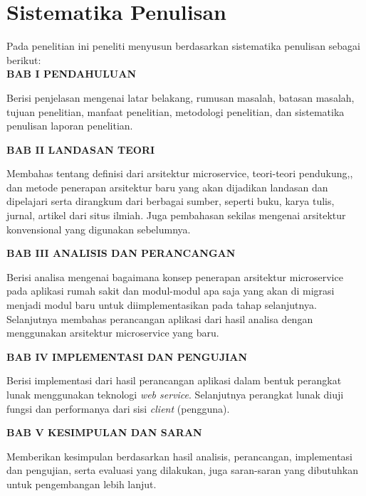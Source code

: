 \section{Sistematika Penulisan}
Pada penelitian ini peneliti menyusun berdasarkan sistematika penulisan sebagai berikut: \\[0.5cm]
\noindent \textbf{BAB I \hspace{1cm} PENDAHULUAN}
\begin{addmargin}[2.35cm]{0em}
Berisi penjelasan mengenai latar belakang, rumusan masalah, batasan masalah, tujuan penelitian, manfaat penelitian, metodologi penelitian, dan sistematika penulisan laporan penelitian. 
\end{addmargin}
\noindent \textbf{BAB II \hspace{0.8cm} LANDASAN TEORI}
\begin{addmargin}[2.35cm]{0em}
Membahas tentang definisi dari arsitektur microservice, teori-teori pendukung,, dan metode penerapan arsitektur baru yang akan dijadikan landasan dan dipelajari serta dirangkum dari berbagai sumber, seperti buku, karya tulis, jurnal, artikel dari situs ilmiah. Juga pembahasan sekilas mengenai arsitektur konvensional yang digunakan sebelumnya.
\end{addmargin}
\noindent \textbf{BAB III \hspace{0.7cm} ANALISIS DAN PERANCANGAN}
\begin{addmargin}[2.35cm]{0em}
Berisi analisa mengenai bagaimana konsep penerapan arsitektur microservice pada aplikasi rumah sakit dan modul-modul apa saja yang akan di migrasi menjadi modul baru untuk diimplementasikan pada tahap selanjutnya. Selanjutnya membahas perancangan aplikasi dari hasil analisa dengan menggunakan arsitektur microservice yang baru.
\end{addmargin}
\noindent \textbf{BAB IV \hspace{0.7cm} IMPLEMENTASI DAN PENGUJIAN}
\begin{addmargin}[2.35cm]{0em}
Berisi implementasi dari hasil perancangan aplikasi dalam bentuk perangkat lunak menggunakan teknologi \textit{web service}. Selanjutnya perangkat lunak diuji fungsi dan performanya dari sisi \textit{client} (pengguna).
\end{addmargin}
\noindent \textbf{BAB V \hspace{0.8cm} KESIMPULAN DAN SARAN}
\begin{addmargin}[2.35cm]{0em}
Memberikan kesimpulan berdasarkan hasil analisis, perancangan, implementasi dan pengujian, serta evaluasi yang dilakukan, juga saran-saran yang dibutuhkan untuk pengembangan lebih lanjut.
\end{addmargin}

\newpage